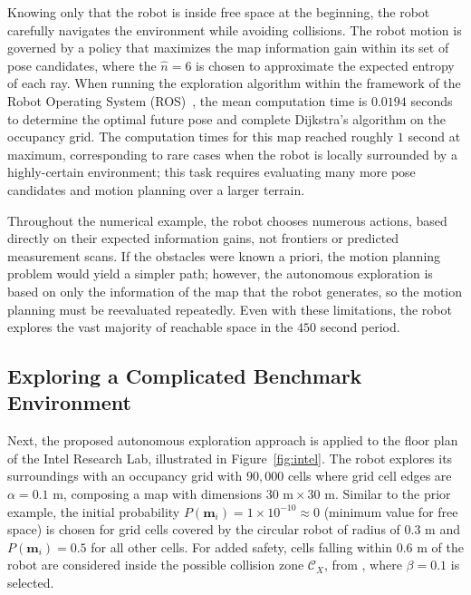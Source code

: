 Knowing only that the robot is inside free space at the beginning, the robot carefully navigates the environment while avoiding collisions. The robot motion is governed by a policy that maximizes the map information gain within its set of pose candidates, where the $\hat n=6$ is chosen to approximate the expected entropy of each ray. 
When running the exploration algorithm within the framework of the Robot Operating System (ROS)~\cite{ROS}, the mean computation time is $0.0194$ seconds to determine the optimal future pose and complete Dijkstra's algorithm on the occupancy grid.
The computation times for this map reached roughly $1$ second at maximum, corresponding to rare cases when the robot is locally surrounded by a highly-certain environment; this task requires evaluating many more pose candidates and motion planning over a larger terrain.

Throughout the numerical example, the robot chooses numerous actions, based directly on their expected information gains, not frontiers or predicted measurement scans. If the obstacles were known a priori, the motion planning problem would yield a simpler path; however, the autonomous exploration is based on only the information of the map that the robot generates, so the motion planning must be reevaluated repeatedly. Even with these limitations, the robot explores the vast majority of reachable space in the $450$ second period. 





\subsection{Exploring a Complicated Benchmark Environment}

Next, the proposed autonomous exploration approach is applied to the floor plan of the Intel Research Lab, illustrated in Figure~\ref{fig:intel}.
The robot explores its surroundings with an occupancy grid with $90,000$ cells where grid cell edges are $\alpha=0.1$ m, composing a map with dimensions $30\text{ m}\times30\text{ m}$.
Similar to the prior example, the initial probability $P(\mathbf{m}_i)=1\times10^{-10}\approx0$ (minimum value for free space) is chosen for grid cells covered by the circular robot of radius of $0.3$ m and $P(\mathbf{m}_i)=0.5$ for all other cells.
For added safety, cells falling within $0.6$ m of the robot are considered inside the possible collision zone $\mathcal{C}_X$, from , where $\beta=0.1$ is selected. 

